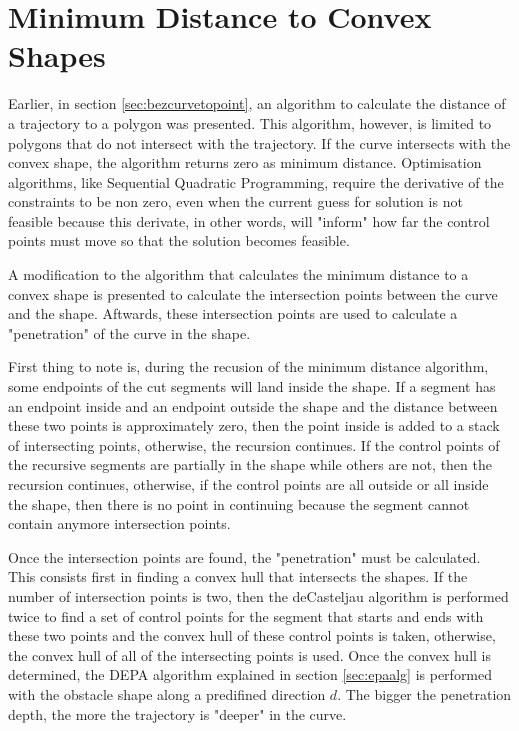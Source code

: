 \section{Minimum Distance to Convex Shapes}

\par Earlier, in section \ref{sec:bezcurvetopoint}, an algorithm to calculate the distance of a trajectory to a polygon was presented. This algorithm, however, is limited to polygons that do not intersect with the trajectory. If the curve intersects with the convex shape, the algorithm returns zero as minimum distance. Optimisation algorithms, like Sequential Quadratic Programming, require the derivative of the constraints to be non zero, even when the current guess for solution is not feasible because this derivate, in other words, will "inform" how far the control points must move so that the solution becomes feasible.

\par A modification to the algorithm that calculates the minimum distance to a convex shape is presented to calculate the intersection points between the curve and the shape. Aftwards, these intersection points are used to calculate a "penetration" of the curve in the shape.
\par First thing to note is, during the recusion of the minimum distance algorithm, some endpoints of the cut segments will land inside the shape. If a segment has an endpoint inside and an endpoint outside the shape and the distance between these two points is approximately zero, then the point inside is added to a stack of intersecting points, otherwise, the recursion continues. If the control points of the recursive segments are partially in the shape while others are not, then the recursion continues, otherwise, if the control points are all outside or all inside the shape, then there is no point in continuing because the segment cannot contain anymore intersection points.
\par Once the intersection points are found, the "penetration" must be calculated. This consists first in finding a convex hull that intersects the shapes. If the number of intersection points is two, then the deCasteljau algorithm is performed twice to find a set of control points for the segment that starts and ends with these two points and the convex hull of these control points is taken, otherwise, the convex hull of all of the intersecting points is used. Once the convex hull is determined, the \ac{DEPA} algorithm explained in section \ref{sec:epaalg}  is performed with the obstacle shape along a predifined direction $d$. The bigger the penetration depth, the more the trajectory is "deeper" in the curve.
